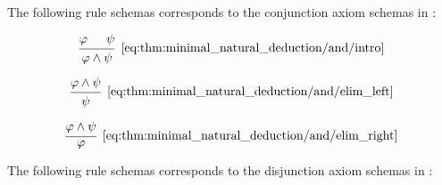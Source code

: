\begin{proposition}
\begin{thmenum}
     The following rule schemas corresponds to the conjunction axiom schemas in :

    \begin{minipage}{0.3\textwidth}
      \begin{equation*}\taglabel[\textrm{R} \( \wedge^+ \)]{eq:thm:minimal_natural_deduction/and/intro}
        \begin{prooftree}
          \hypo{ \varphi }
          \hypo{ \psi }
          \infer2[\ref{eq:thm:minimal_natural_deduction/and/intro}]{ \varphi \wedge \psi }
        \end{prooftree}
      \end{equation*}
    \end{minipage}
    \hfill
    \begin{minipage}{0.3\textwidth}
      \begin{equation*}\taglabel[\textrm{R} \( \wedge_L^- \)]{eq:thm:minimal_natural_deduction/and/elim_left}
        \begin{prooftree}
          \hypo{ \varphi \wedge \psi }
          \infer1[\ref{eq:thm:minimal_natural_deduction/and/elim_left}]{ \psi }
        \end{prooftree}
      \end{equation*}
    \end{minipage}
    \hfill
    \begin{minipage}{0.3\textwidth}
      \begin{equation*}\taglabel[\textrm{R} \( \wedge_R^- \)]{eq:thm:minimal_natural_deduction/and/elim_right}
        \begin{prooftree}
          \hypo{ \varphi \wedge \psi }
          \infer1[\ref{eq:thm:minimal_natural_deduction/and/elim_right}]{ \varphi }
        \end{prooftree}
      \end{equation*}
    \end{minipage}

     The following rule schemas corresponds to the disjunction axiom schemas in :


\end{thmenum}
\end{proposition}
